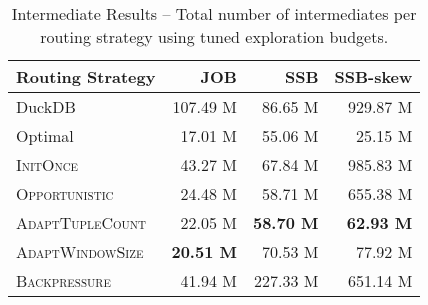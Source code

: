 \begin{table}[!t]
	\centering
	\caption{Intermediate Results -- Total number of intermediates per routing strategy using tuned exploration budgets.}
	\vspace{-0.3cm} \setlength\tabcolsep{7.9pt}
  \begin{tabular}{lrrr}
	\toprule
		\textbf{Routing Strategy} & \textbf{JOB} & \textbf{SSB} & \textbf{SSB-skew}\\
		\midrule
		DuckDB &     107.49 M &      86.65 M &     929.87 M\\
		Optimal &      17.01 M &      55.06 M &      25.15 M\\
        \midrule
		\textsc{InitOnce} &      43.27 M &      67.84 M &     985.83 M\\
		\textsc{Opportunistic} &      24.48 M &      58.71 M &     655.38 M\\
		\textsc{AdaptTupleCount} &      22.05 M &      \textbf{58.70 M} &      \textbf{62.93 M}\\
		\textsc{AdaptWindowSize} &      \textbf{20.51 M} &      70.53 M &     77.92 M\\
		\textsc{Backpressure} &      41.94 M &     227.33 M &     651.14 M\\
		\bottomrule
	\end{tabular}
	\label{tab:2_4_routing_all}
\end{table}
